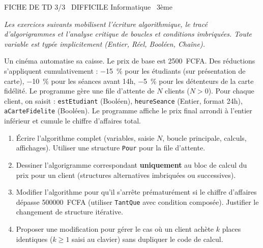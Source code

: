 \documentclass[11pt]{article}
\begin{document}
\begin{tcolorbox}[enhanced,colback=popink,colframe=popink,arc=10pt,boxrule=0pt,left=12pt,right=12pt,top=9pt,bottom=9pt]
{\color{white}\popxbold\small FICHE DE TD 3/3 \textbullet\ DIFFICILE \hfill Informatique \textbullet\ 3ème\par}
\end{tcolorbox}
\vspace{4pt}
\noindent \textit{Les exercices suivants mobilisent l'écriture algorithmique, le tracé d'algorigrammes et l'analyse critique de boucles et conditions imbriquées. Toute variable est typée implicitement (Entier, Réel, Booléen, Chaîne).}

\begin{exercice}
Un cinéma automatise sa caisse. Le prix de base est \SI{2500}{FCFA}. Des réductions s'appliquent cumulativement : \SI{-15}{\%} pour les étudiants (sur présentation de carte), \SI{-10}{\%} pour les séances avant 14h, \SI{-5}{\%} pour les détenteurs de la carte fidélité. Le programme gère une file d'attente de $N$ clients ($N > 0$). Pour chaque client, on saisit : \texttt{estEtudiant} (Booléen), \texttt{heureSeance} (Entier, format 24h), \texttt{aCarteFidelite} (Booléen). Le programme affiche le prix final arrondi à l'entier inférieur et cumule le chiffre d'affaires total.
\begin{enumerate}
    \item Écrire l'algorithme complet (variables, saisie $N$, boucle principale, calculs, affichages). Utiliser une structure \texttt{Pour} pour la file d'attente.
    \item Dessiner l'algorigramme correspondant \textbf{uniquement} au bloc de calcul du prix pour un client (structures alternatives imbriquées ou successives).
    \item Modifier l'algorithme pour qu'il s'arrête prématurément si le chiffre d'affaires dépasse \SI{500000}{FCFA} (utiliser \texttt{TantQue} avec condition composée). Justifier le changement de structure itérative.
    \item Proposer une modification pour gérer le cas où un client achète $k$ places identiques ($k \ge 1$ saisi au clavier) sans dupliquer le code de calcul.
\end{enumerate}
\end{exercice}
\end{document}

